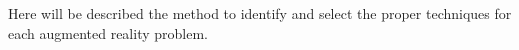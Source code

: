 Here will be described the method to identify and select the proper techniques for each augmented reality problem.